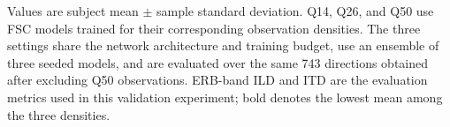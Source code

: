 \begin{table}[htbp]
\centering\scriptsize
\setlength{\tabcolsep}{2.3pt}
\caption{FSC sparsity experiment (44 validation subjects, 743 shared directions)}
\label{tab:q-results-validation}
\par\smallskip
\parbox{\linewidth}{\footnotesize Values are subject mean $\pm$ sample standard deviation. Q14, Q26, and Q50 use FSC models trained for their corresponding observation densities. The three settings share the network architecture and training budget, use an ensemble of three seeded models, and are evaluated over the same 743 directions obtained after excluding Q50 observations. ERB-band ILD and ITD are the evaluation metrics used in this validation experiment; bold denotes the lowest mean among the three densities.}
\end{table}

